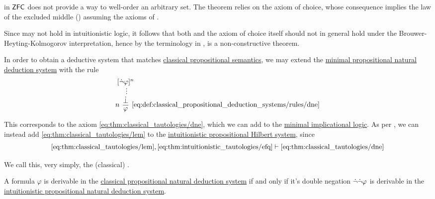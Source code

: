 \begin{example}\label{ex:con:brouwer_heyting_kolmogorov_interpretation/well_ordering_principle_zfc}
   in \hyperref[def:zfc]{\( \textsf{ZFC} \)} does not provide a way to well-order an arbitrary set. The theorem relies on the axiom of choice, whose consequence  implies the law of the excluded middle () assuming the axioms of .

  Since  may not hold in intuitionistic logic, it follows that both  and the axiom of choice itself should not in general hold under the Brouwer-Heyting-Kolmogorov interpretation, hence by the terminology in ,  is a non-constructive theorem.
\end{example}

\begin{definition}\label{def:classical_propositional_deduction_systems}
  In order to obtain a deductive system that matches \hyperref[def:propositional_entailment]{classical propositional semantics}, we may extend the \hyperref[def:minimal_propositional_natural_deduction_system]{minimal propositional natural deduction system} with the rule
  \begin{equation*}\taglabel[\logic{DNE}]{eq:def:classical_propositional_deduction_systems/rules/dne}
    \begin{prooftree}
      \hypo{ [\synneg \varphi]^n }
      \ellipsis {} { \synbot }
      \infer[left label=\( n \)]1[\ref{eq:def:classical_propositional_deduction_systems/rules/dne}]{ \varphi }
    \end{prooftree}
  \end{equation*}

  This corresponds to the axiom \eqref{eq:thm:classical_tautologies/dne}, which we can add to the \hyperref[def:minimal_implicational_logic]{minimal implicational logic}. As per , we can instead add \eqref{eq:thm:classical_tautologies/lem} to the \hyperref[def:intuitionistic_propositional_deduction_systems]{intuitionistic propositional Hilbert system}, since
  \begin{equation*}
    \eqref{eq:thm:classical_tautologies/lem}, \eqref{eq:thm:intuitionistic_tautologies/efq} \vdash \eqref{eq:thm:classical_tautologies/dne}
  \end{equation*}

  We call this, very simply, the (classical) .
\end{definition}

\begin{theorem}\label{thm:glivenkos_double_negation_theorem}
  A formula \( \varphi \) is derivable in the \hyperref[def:classical_propositional_deduction_systems]{classical propositional natural deduction system} if and only if it's double negation \( \dot\neg \dot\neg \varphi \) is derivable in the \hyperref[def:intuitionistic_propositional_deduction_systems]{intuitionistic propositional natural deduction system}.
\end{theorem}
